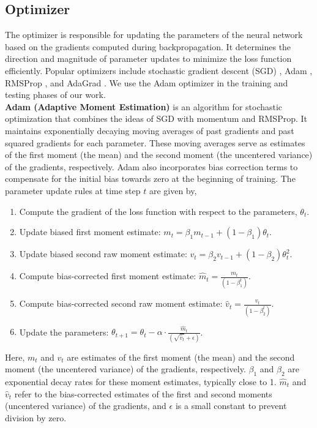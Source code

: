 \subsection{Optimizer} 
The optimizer is responsible for updating the parameters of the neural network based on the gradients computed during backpropagation. It determines the direction and magnitude of parameter updates to minimize the loss function efficiently. Popular optimizers include stochastic gradient descent (SGD) \cite{sgd}, Adam \cite{adam}, RMSProp \cite{rmsprop}, and AdaGrad \cite{adagrad}. We use the Adam optimizer in the training and testing phases of our work. \\
 \textbf{Adam (Adaptive Moment Estimation)} is an algorithm for stochastic optimization that combines the ideas of SGD with momentum and RMSProp. It maintains exponentially decaying moving averages of past gradients and past squared gradients for each parameter. These moving averages serve as estimates of the first moment (the mean) and the second moment (the uncentered variance) of the gradients, respectively. Adam also incorporates bias correction terms to compensate for the initial bias towards zero at the beginning of training. The parameter update rules at time step $t$ are given by,
 \begin{enumerate}
  \item Compute the gradient of the loss function with respect to the parameters, \(\theta_t\).
  \item Update biased first moment estimate: \(m_t = \beta_1 m_{t-1} + (1 - \beta_1)\theta_t\).
  \item Update biased second raw moment estimate: \(v_t = \beta_2 v_{t-1} + (1 - \beta_2)\theta_t^2\).
  \item Compute bias-corrected first moment estimate: \(\hat{m}_t = \frac{m_t}{(1 - \beta_1^t)}\).
  \item Compute bias-corrected second raw moment estimate: \(\hat{v}_t = \frac{v_t}{(1 - \beta_2^t)}\).
  \item Update the parameters: \(\theta_{t+1} = \theta_t - \alpha \cdot \frac{\hat{m}_t}{(\sqrt{\hat{v}_t} + \epsilon)}\).
\end{enumerate}
Here, \(m_t\) and \(v_t\) are estimates of the first moment (the mean) and the second moment (the uncentered variance) of the gradients, respectively. \(\beta_1\) and \(\beta_2\) are exponential decay rates for these moment estimates, typically close to 1. $\hat{m}_t$ and $\hat{v}_t$ refer to the bias-corrected estimates of the first and second moments (uncentered variance) of the gradients, and $\epsilon$ is a small constant to prevent division by zero.
